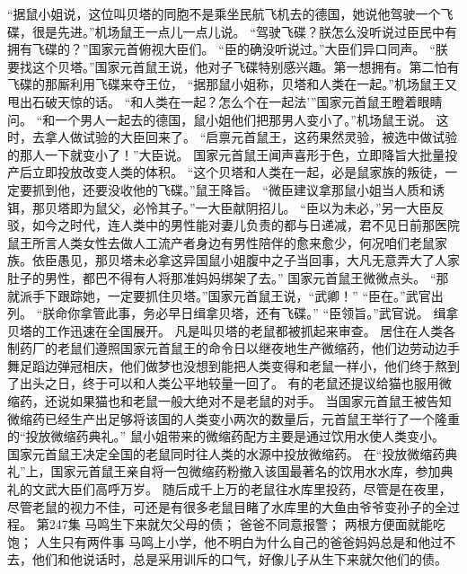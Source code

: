 \documentclass[a4paper,12pt,UTF8,twoside]{ctexbook}
\begin{document}
        “据鼠小姐说，这位叫贝塔的同胞不是乘坐民航飞机去的德国，她说他驾驶一个飞碟，很是先进。”机场鼠王一点儿一点儿说。  
        “驾驶飞碟？朕怎么没听说过臣民中有拥有飞碟的？”国家元首俯视大臣们。  
        “臣的确没听说过。”大臣们异口同声。  
        “朕要找这个贝塔。”国家元首鼠王说，他对子飞碟特别感兴趣。第一想拥有。第二怕有飞碟的那厮利用飞碟来夺王位，  
        “据那鼠小姐称，贝塔和人类在一起。”机场鼠王又甩出石破天惊的话。  
        “和人类在一起？怎么个在一起法’”国家元首鼠王瞪着眼睛问。  
        “和一个男人一起去的德国，鼠小姐他们把那男人变小了。”机场鼠王说。  
        这时，去拿人做试验的大臣回来了。  
        “启禀元首鼠王，这药果然灵验，被选中做试验的那人一下就变小了！”大臣说。  
        国家元首鼠王闻声喜形于色，立即降旨大批量投产后立即投放改变人类的体积。  
        “这个贝塔和人类在一起，必是鼠家族的叛徒，一定要抓到他，还要没收他的飞碟。”鼠王降旨。  
        “微臣建议拿那鼠小姐当人质和诱铒，那贝塔即为鼠父，必怜其子。”一大臣献阴招儿。  
        “臣以为未必，”另一大臣反驳，如今之时代，连人类中的男性能对妻儿负责的都与日递减，君不见日前那医院鼠王所言人类女性去做人工流产者身边有男性陪伴的愈来愈少，何况咱们老鼠家族。依臣愚见，那贝塔未必拿这异国鼠小姐腹中之子当回事，大凡无意弄大了人家肚子的男性，都巴不得有人将那准妈妈绑架了去。”  
        国家元首鼠王微微点头。  
        “那就派手下跟踪她，一定要抓住贝塔。”国家元首鼠王说，“武卿！”  
        “臣在。”武官出列。  
        “朕命你拿管此事，务必早日缉拿贝塔，还有飞碟。”  
        “臣领旨。”武官说。        
        缉拿贝塔的工作迅速在全国展开。  
        凡是叫贝塔的老鼠都被抓起来审查。  
        居住在人类各制药厂的老鼠们遵照国家元首鼠王的命令日以继夜地生产微缩药，他们边劳动边手舞足蹈边弹冠相庆，他们做梦也没想到能把人类变得和老鼠一样小，他们终于熬到了出头之日，终于可以和人类公平地较量一回了。  
        有的老鼠还提议给猫也服用微缩药，还说如果猫也和老鼠一般大绝对不是老鼠的对手。  
        当国家元首鼠王被告知微缩药已经生产出足够将该国的人类变小两次的数量后，元首鼠王举行了一个隆重的“投放微缩药典礼。”  
        鼠小姐带来的微缩药配方主要是通过饮用水使人类变小。  
        国家元首鼠王决定全国的老鼠同时往人类的水源中投放微缩药。  
        在“投放微缩药典礼”上，国家元首鼠王亲自将一包微缩药粉撤入该国最著名的饮用水水库，参加典礼的文武大臣们高呼万岁。  
        随后成千上万的老鼠往水库里投药，尽管是在夜里，尽管老鼠的视力不佳，可还是有很多老鼠目睹了水库里的大鱼由爷爷变孙子的全过程。          第247集  
        马鸣生下来就欠父母的债；  
        爸爸不同意报警；  
        两根方便面就能吃饱；  
        人生只有两件事    
        马鸣上小学，他不明白为什么自己的爸爸妈妈总是和他过不去，他们和他说话时，总是采用训斥的口气，好像儿子从生下来就欠他们的债。  
\end{document}
